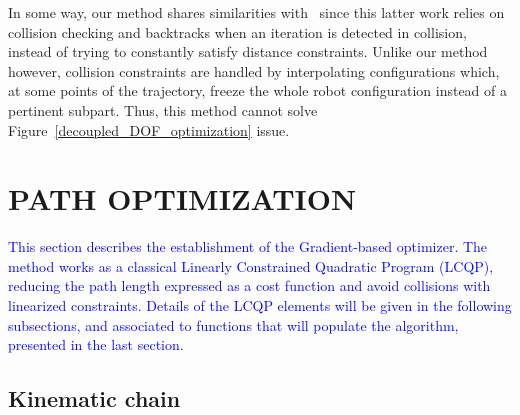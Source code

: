 \documentclass{tADR2e}
\begin{document}
In some way, our method shares similarities with~\cite{PanSmoothSplineShort} 
since this latter work relies on collision checking and backtracks when an 
iteration is detected in collision, instead of trying to constantly satisfy 
distance constraints. Unlike our method however, collision constraints are 
handled by interpolating configurations which, at some points of the trajectory, 
freeze the whole robot configuration instead of a pertinent subpart. Thus, this 
method cannot solve Figure~\ref{decoupled_DOF_optimization} issue.


\section{PATH OPTIMIZATION} \label{section:path_optim}

\textcolor{blue}{This section describes the establishment of the Gradient-based optimizer. The method works as a classical Linearly Constrained Quadratic Program (LCQP), reducing the path length expressed as a cost function and avoid collisions with linearized constraints. Details of the LCQP elements will be given in the following subsections, and associated to functions that will populate the algorithm, presented in the last section.}

\subsection {Kinematic chain}
\end{document}
